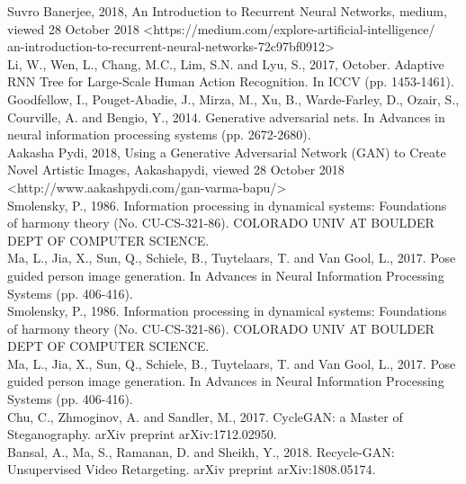 \newline
[11] Suvro Banerjee, 2018, An Introduction to Recurrent Neural Networks, medium, viewed 28 October 2018 <https://medium.com/explore-artificial-intelligence/\\
an-introduction-to-recurrent-neural-networks-72c97bf0912>\\
\newline
[12] Li, W., Wen, L., Chang, M.C., Lim, S.N. and Lyu, S., 2017, October. Adaptive RNN Tree for Large-Scale Human Action Recognition. In ICCV (pp. 1453-1461).\\
\newline
[13] Goodfellow, I., Pouget-Abadie, J., Mirza, M., Xu, B., Warde-Farley, D., Ozair, S., Courville, A. and Bengio, Y., 2014. Generative adversarial nets. In Advances in neural information processing systems (pp. 2672-2680).\\
\newline
[14] Aakasha Pydi, 2018, Using a Generative Adversarial Network (GAN) to Create Novel Artistic Images, Aakashapydi, viewed 28 October 2018\\ 
<http://www.aakashpydi.com/gan-varma-bapu/>\\
\newline
[15] Smolensky, P., 1986. Information processing in dynamical systems: Foundations of harmony theory (No. CU-CS-321-86). COLORADO UNIV AT BOULDER DEPT OF COMPUTER SCIENCE.\\
\newline
[16] Ma, L., Jia, X., Sun, Q., Schiele, B., Tuytelaars, T. and Van Gool, L., 2017. Pose guided person image generation. In Advances in Neural Information Processing Systems (pp. 406-416).\\
\newline
[17] Smolensky, P., 1986. Information processing in dynamical systems: Foundations of harmony theory (No. CU-CS-321-86). COLORADO UNIV AT BOULDER DEPT OF COMPUTER SCIENCE.\\
\newline
[18] Ma, L., Jia, X., Sun, Q., Schiele, B., Tuytelaars, T. and Van Gool, L., 2017. Pose guided person image generation. In Advances in Neural Information Processing Systems (pp. 406-416).\\
\newline
[19] Chu, C., Zhmoginov, A. and Sandler, M., 2017. CycleGAN: a Master of Steganography. arXiv preprint arXiv:1712.02950.\\
\newline
[20] Bansal, A., Ma, S., Ramanan, D. and Sheikh, Y., 2018. Recycle-GAN: Unsupervised Video Retargeting. arXiv preprint arXiv:1808.05174.\\
